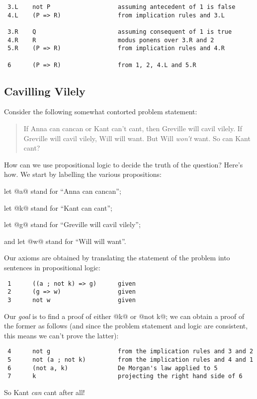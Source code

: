 \begin{itemize}
\begin{verbatim}
 3.L    not P                   assuming antecedent of 1 is false
 4.L    (P => R)                from implication rules and 3.L

 3.R    Q                       assuming consequent of 1 is true
 4.R    R                       modus ponens over 3.R and 2
 5.R    (P => R)                from implication rules and 4.R

 6      (P => R)                from 1, 2, 4.L and 5.R
\end{verbatim}

\subsection{Cavilling Vilely}


Consider the following somewhat contorted problem statement:
\begin{quote}
If Anna can cancan or Kant can't cant, then Greville will cavil vilely.
If Greville will cavil vilely, Will will want.
But Will \emph{won't} want.
So can Kant cant?
\end{quote}
How can we use propositional logic to decide the truth of the question?
Here's how.  We start by labelling the various propositions:
\begin{description}
\item let @a@ stand for ``Anna can cancan'';
\item let @k@ stand for ``Kant can cant'';
\item let @g@ stand for ``Greville will cavil vilely'';
\item and let @w@ stand for ``Will will want''.
\end{description}

Our axioms are obtained by translating the statement of the problem into
sentences in propositional logic:
\begin{verbatim}
 1      ((a ; not k) => g)      given
 2      (g => w)                given
 3      not w                   given
\end{verbatim}
Our \emph{goal} is to find a proof of either @k@ or @not k@; we can
obtain a proof of the former as follows (and since the problem statement
and logic are consistent, this means we can't prove the latter):
\begin{verbatim}
 4      not g                   from the implication rules and 3 and 2
 5      not (a ; not k)         from the implication rules and 4 and 1
 6      (not a, k)              De Morgan's law applied to 5
 7      k                       projecting the right hand side of 6
\end{verbatim}
So Kant \emph{can} cant after all!


\end{itemize}

